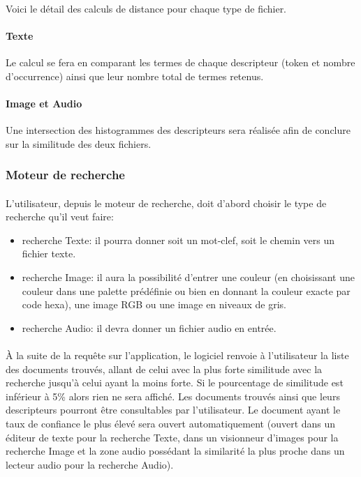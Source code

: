 \documentclass[../main.tex]{subfiles}
\begin{document}
    \paragraph{}
    Voici le détail des calculs de distance pour chaque type de fichier.

    \paragraph{Texte}
    Le calcul se fera en comparant les termes de chaque descripteur (token et nombre d'occurrence) ainsi que leur nombre total de termes retenus.

    \paragraph{Image et Audio}
    Une intersection des histogrammes des descripteurs sera réalisée afin de conclure sur la similitude des deux fichiers.



    \subsubsection{Moteur de recherche}
    \paragraph{}
    L’utilisateur, depuis le moteur de recherche, doit d’abord choisir le type de recherche qu’il veut faire:
    \begin{itemize}
        \item recherche Texte: il pourra donner soit un mot-clef, soit le chemin vers un fichier texte.
        \item recherche Image: il aura la possibilité d’entrer une couleur (en choisissant une couleur dans une palette prédéfinie ou bien en donnant la couleur exacte par code hexa), une image RGB ou une image en niveaux de gris.
        \item recherche Audio: il devra donner un fichier audio en entrée.
    \end{itemize}

    \paragraph{}
    À la suite de la requête sur l’application, le logiciel renvoie à l’utilisateur la liste des documents trouvés, allant de celui avec la plus forte similitude avec la recherche jusqu’à celui ayant la moins forte. Si le pourcentage de similitude est inférieur à 5\% alors rien ne sera affiché. Les documents trouvés ainsi que leurs descripteurs pourront être consultables par l’utilisateur. Le document ayant le taux de confiance le plus élevé sera ouvert automatiquement (ouvert dans un éditeur de texte pour la recherche Texte, dans un visionneur d’images pour la recherche Image et la zone audio possédant la similarité la plus proche dans un lecteur audio pour la recherche Audio).
\end{document}
